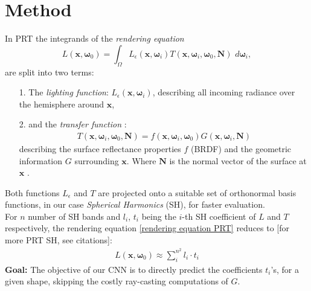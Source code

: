 \section{Method}
In PRT the integrands of the \textit{rendering equation}
\begin{equation}
L(\bm{x}, \bm{\omega}_0 ) = 
\int_{\Omega} L_{\epsilon}(\bm{x}, \bm{\omega}_i ) 
T(\bm{x},\bm{\omega}_i,\bm{\omega}_0, \bm{N}) 
\,  \, d\bm{\omega}_i ,
\label{rendering equation PRT}
\end{equation}
 are split into two terms:
\begin{itemize}
\item[1.] The \textit{lighting function}: $L_{\epsilon}(\bm{x}, \bm{\omega}_i ) $, describing all incoming radiance over the hemisphere around $\bm{x}$,
\item[2.] and the \textit{transfer function} :  
\begin{align*}
T(\bm{x},\bm{\omega}_i,\bm{\omega}_0, \bm{N}) = f(\bm{x},\bm{\omega}_i,\bm{\omega}_0) G(\bm{x},\bm{\omega}_i,\bm{N}) 
\end{align*}
describing the surface reflectance properties $f$ (BRDF) and the geometric information $G$ surrounding $\bm{x}$. 
Where $\bm{N}$ is the normal vector of the surface at $\bm{x}$ .
\end{itemize}
Both functions $L_{\epsilon} $ and $T$ are projected onto a suitable set of orthonormal basis functions, in our case \textit{Spherical Harmonics} (SH), for faster evaluation.\\
For $n$ number of SH bands and $l_i$, $t_i$ being the $i$-th SH coefficient of $L$ and $T$ respectively, the rendering equation \ref{rendering equation PRT} reduces to  [for more PRT SH, see citations]: 
\begin{align*}
L(\bm{x}, \bm{\omega}_0 ) \approx \sum_{i}^{n^2} l_i \cdot t_i
\end{align*}
\textbf{Goal:} The objective of our CNN is to directly predict the coefficients $t_i$'s, for a given shape, skipping the costly ray-casting computations of $G$. 
